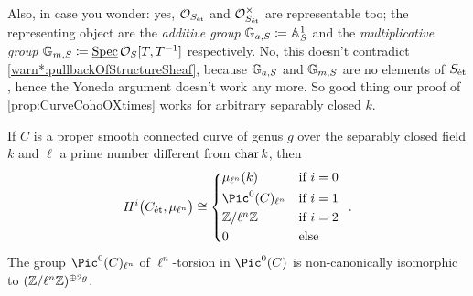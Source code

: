 Also, in case you wonder: yes, $\mathcal{O}_{S_{\mathrm{\acute{e}t}}}$ and $\mathcal{O}_{S_{\mathrm{\acute{e}t}}}^\times$ are representable too; the representing object are the \emph{additive group} $\mathbb{G}_{a,S}\coloneqq \mathbb{A}_S^1$ and the \emph{multiplicative group} $\mathbb{G}_{m,S}\coloneqq \operatorname{\underline{\smash{\mathrm{Spec}}}} \mathcal{O}_S[T,T^{-1}]$ respectively. No, this doesn't contradict \cref{warn*:pullbackOfStructureSheaf}, because $\mathbb{G}_{a,S}$ and $\mathbb{G}_{m,S}$ are no elements of $S_{\mathrm{\acute{e}t}}$, hence the Yoneda argument doesn't work any more. So good thing our proof of \cref{prop:CurveCohoOXtimes} works for arbitrary separably closed $k$.
\begin{cor}\label{cor:cohoOfmu}
	If $C$ is a proper smooth connected curve of genus $g$ over the separably closed field $k$ and $\ell$ a prime number different from $\operatorname{char} k$, then
	\begin{equation*}
		H^i\big(C_\et,\mu_{\ell^n}\big)\cong \begin{cases*}
			\mu_{\ell^n}(k) & if $i=0$\\
			\Pic^0(C)_{\ell^n} & if $i=1$\\
			\IZ/\ell^n\IZ & if $i=2$ \\
			0 & else
		\end{cases*}\,.
	\end{equation*}
 	The group $\Pic^0(C)_{\ell^n}$ of $\ell^n$-torsion in $\Pic^0(C)$ is non-canonically isomorphic to $(\mathbb{Z}/\ell^n\mathbb{Z})^{\oplus2g}$.
\end{cor}
